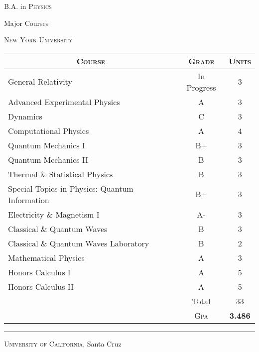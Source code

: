 \documentclass[a4paper,10pt]{article} %
\begin{document}

\par{\centering\Large \hypertarget{grds}{B.A. in
    \textsc{Physics}}\par}\large{\centering Major Courses\par}\normalsize
\centering\textsc{New York University}
\begin{center}
\begin{tabular}{lcc}
\multicolumn{1}{c}{\textsc{Course}} & \textsc{Grade}&\textsc{Units}\\ \hline
General Relativity & In Progress & 3 \\
Advanced Experimental Physics & A & 3 \\
Dynamics & C & 3\\
Computational Physics & A & 4\\
Quantum Mechanics I & B+ & 3\\
Quantum Mechanics II & B & 3\\
Thermal \& Statistical Physics & B & 3 \\
Special Topics in Physics: Quantum Information & B+ & 3\\
Electricity \& Magnetism I & A- & 3\\
Classical \& Quantum Waves & B & 3\\
Classical \& Quantum Waves Laboratory & B & 2\\
Mathematical Physics & A & 3\\
Honors Calculus I & A & 5\\
Honors Calculus II & A & 5\\

& Total & 33\\\cline{2-3}
&\textsc{Gpa}&\textbf{3.486}
\end{tabular}
\end{center}
\bigskip
\hrule
\bigskip


\bigskip

\par{\centering\Large\hypertarget{grds_ucsc}{\textsc{University of
    California}, Santa Cruz}}
\end{document}
